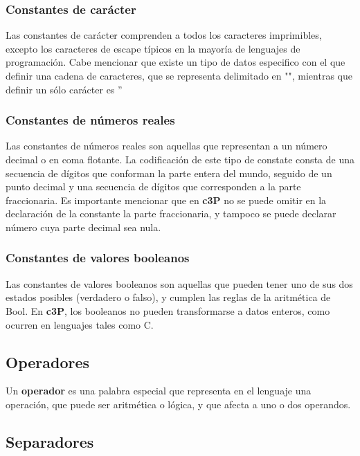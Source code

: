 \subsubsection{Constantes de carácter}

Las constantes de carácter comprenden a todos los caracteres imprimibles, excepto los
caracteres de escape típicos en la mayoría de lenguajes de programación. Cabe mencionar
que existe un tipo de datos especifico con el que definir una cadena de caracteres,
que se representa delimitado en "", mientras que definir un sólo carácter es  ''

\subsubsection{Constantes de números reales}

Las constantes de números reales son aquellas que representan a un número decimal o
en coma flotante. La codificación de este tipo de constate consta de una secuencia
de dígitos que conforman la parte entera del mundo, seguido de un punto decimal y
una secuencia de dígitos que corresponden a la parte fraccionaria. Es importante
mencionar que en \textbf{c3P} no se puede omitir en la declaración de la constante
la parte fraccionaria, y tampoco se puede declarar número cuya parte decimal sea nula.

\subsubsection{Constantes de valores booleanos}

Las constantes de valores booleanos son aquellas que pueden tener uno de sus
dos estados posibles (verdadero o falso), y cumplen las reglas de la aritmética
de Bool. En \textbf{c3P}, los booleanos no pueden transformarse a datos enteros,
como ocurren en lenguajes tales como C.

\subsection{Operadores}

Un \textbf{operador} es una palabra especial que representa en el lenguaje una operación,
que puede ser aritmética o lógica, y que afecta a uno o dos operandos.

\subsection{Separadores}

